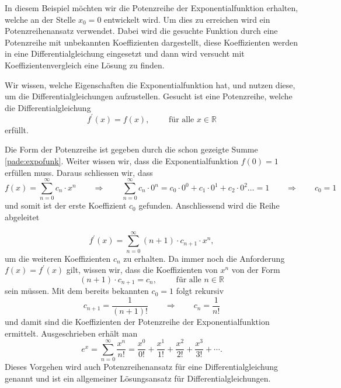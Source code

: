 \begin{beispiel}
\label{pade:section:Bsp_Potenzreihen}
In diesem Beispiel möchten wir die Potenzreihe der Exponentialfunktion erhalten, welche an der Stelle $x_0 = 0$ entwickelt wird.
%
Um dies zu erreichen wird ein Potenzreihenansatz verwendet.
%
Dabei wird die gesuchte Funktion durch eine Potenzreihe mit unbekannten
Koeffizienten dargestellt, diese Koeffizienten werden in eine
Differentialgleichung eingesetzt und dann wird versucht mit
Koeffizientenvergleich  eine Lösung zu finden.
%

Wir wissen, welche Eigenschaften die Exponentialfunktion hat, und
nutzen diese, um die Differentialgleichungen aufzustellen.
Gesucht ist eine Potenzreihe, welche die Differentialgleichung 
\begin{equation*}
	f^{\prime}(x) = f(x) , \qquad \text{ für alle } x \in \mathbb{R} 
\end{equation*}
erfüllt.

Die Form der Potenzreihe ist gegeben durch die schon gezeigte Summe \eqref{pade:expofunk}.
Weiter wissen wir, dass die Exponentialfunktion 
$f(0) = 1$
erfüllen muss.
Daraus schliessen wir, dass
\begin{equation*}
f(x)=\sum_{n=0}^{\infty} c_{n} \cdot x^{n}
\qquad\Rightarrow\qquad
\sum_{n=0}^{\infty} c_{n} \cdot 0^{n} 
=
c_{0} \cdot 0^{0} + c_{1} \cdot 0^{1} + c_{2} \cdot 0^{2} \dots = 1
\qquad\Rightarrow\qquad
c_{0} = 1
\end{equation*}
und somit ist der erste Koeffizient $c_0$ gefunden.
Anschliessend wird die Reihe abgeleitet

\begin{equation*}
f^{\prime}(x)
=
\sum_{n=0}^{\infty}(n+1) \cdot c_{n+1} \cdot x^{n},
\end{equation*}
um die weiteren Koeffizienten $c_n$ zu erhalten.
Da immer noch die Anforderung $f(x) = f^{\prime}(x)$ gilt, wissen wir, dass die Koeffizienten von $x^n$  von der Form
\begin{equation*}
(n+1) \cdot c_{n+1} 
= 
c_{n} , \qquad \text{ für alle } n \in \mathbb{R}
\end{equation*}
sein müssen. 
Mit dem bereits bekannten $c_0 = 1$ folgt rekursiv
\begin{equation*}
c_{n+1} 
= 
\frac{1}{(n+1)!}
\qquad\Rightarrow\qquad
c_{n} 
= 
\frac{1}{n!}
\end{equation*}
und damit sind die Koeffizienten der Potenzreihe der Exponentialfunktion
ermittelt.
Ausgeschrieben erhält man
\begin{equation}
e^{x}
=
\sum_{n=0}^{\infty} \frac{x^{n}}{n !}
=
\frac{x^{0}}{0 !}+\frac{x^{1}}{1 !}+\frac{x^{2}}{2 !}+\frac{x^{3}}{3 !}+\cdots .
\label{pade:potenzexp}
\end{equation}
Dieses Vorgehen wird auch Potenzreihenansatz für eine Differentialgleichung genannt und ist ein allgemeiner Lösungsansatz für Differentialgleichungen.


\end{beispiel}
